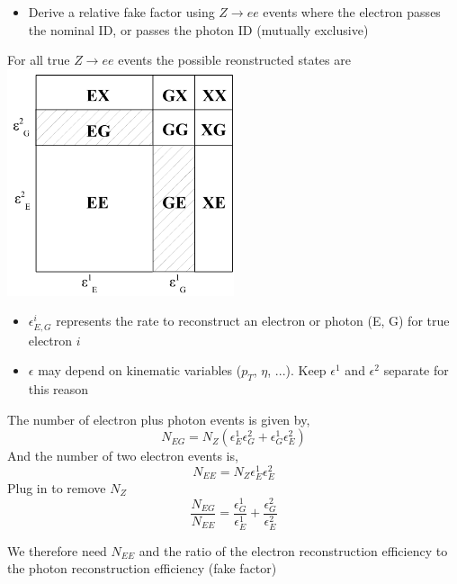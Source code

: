 \documentclass{beamer}
\begin{document}
 {

    \begin{itemize}
        \item Derive a relative fake factor using $Z\to ee$ events where the electron passes the nominal ID, or passes the photon ID (mutually exclusive)
    \end{itemize}
    
    \begin{center}
        For all true $Z\to ee$ events the possible reonstructed states are
        \includegraphics[width=0.5\textwidth]{Figures/ElectronPhotonBox.pdf}
    \end{center}


}

 {


    \begin{itemize}
        \item $\epsilon_{E,G}^{i}$ represents the rate to reconstruct an electron or photon (E, G) for true electron $i$
        \item $\epsilon$ may depend on kinematic variables ($p_{T}$, $\eta$, ...).  Keep $\epsilon^{1}$ and $\epsilon^{2}$ separate for this reason
    \end{itemize}

    The number of electron plus photon events is given by,
    \begin{equation}
        N_{EG} = N_{Z} \left( \epsilon_{E}^{1}\epsilon_{G}^{2} + \epsilon_{G}^{1}\epsilon_{E}^{2}\right) 
    \end{equation} 
    And the number of two electron events is,
    \begin{equation}
      N_{EE} = N_{Z} \epsilon_{E}^{1}\epsilon_{E}^{2}
    \end{equation} 
      Plug in to remove $N_{Z}$
    \begin{equation}
    \frac{N_{EG}}{N_{EE}} = \frac{\epsilon_{G}^{1}}{\epsilon_{E}^{1}} + \frac{ \epsilon_{G}^{2}}{\epsilon_{E}^{2}} 
    \end{equation} 

    We therefore need $N_{EE}$ and the ratio of the electron reconstruction efficiency to the photon reconstruction efficiency (fake factor)
      
}
\end{document}
